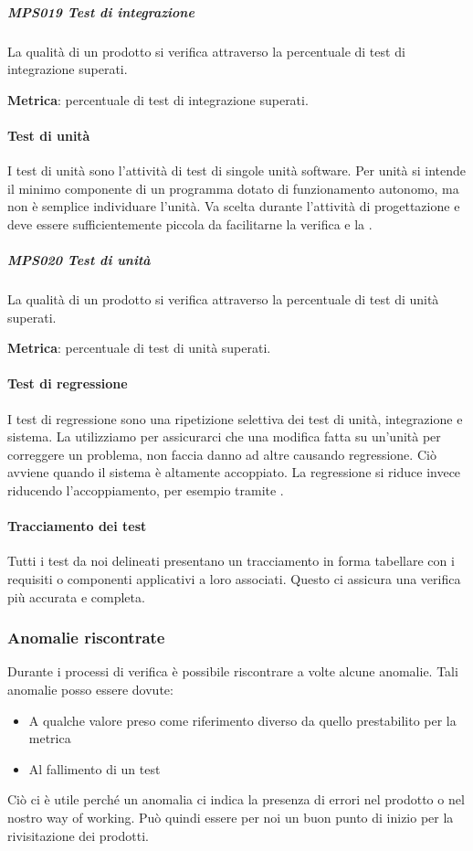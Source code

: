             \subparagraph{MPS019 Test di integrazione}\label{testintegrazione:met}
            La qualità di un prodotto si verifica attraverso la percentuale di test di integrazione superati.

            \textbf{Metrica}: percentuale di test di integrazione superati.

			\paragraph{Test di unità} \label{testunita}
			I test di unità sono l'attività di test di singole unità software.
			Per unità si intende il minimo componente di un programma dotato di funzionamento autonomo, ma non è semplice individuare l'unità.
			Va scelta durante l'attività di progettazione e deve essere sufficientemente piccola da facilitarne la verifica e la .

            \subparagraph{MPS020 Test di unità}\label{testunita:met}
            La qualità di un prodotto si verifica attraverso la percentuale di test di unità superati.

            \textbf{Metrica}: percentuale di test di unità superati.

			\paragraph{Test di regressione} \label{testregressione}
			I test di regressione sono una ripetizione selettiva dei test di unità, integrazione e sistema.
			La utilizziamo per assicurarci che una modifica fatta su un'unità per correggere un problema, non faccia danno ad altre causando regressione.
			Ciò avviene quando il sistema è altamente accoppiato.
			La regressione si riduce invece riducendo l'accoppiamento, per esempio tramite .

			\paragraph{Tracciamento dei test} \label{TracciamentoTest}
			Tutti i test da noi delineati presentano un tracciamento in forma tabellare con i requisiti o componenti applicativi a loro associati.
			Questo ci assicura una verifica più accurata e completa.


		\subsubsection{Anomalie riscontrate}\label{Anomalie}
		Durante i processi di verifica è possibile riscontrare a volte alcune anomalie.
		Tali anomalie posso essere dovute:
		\begin{itemize}
			\item A qualche valore preso come riferimento diverso da quello prestabilito per la metrica
			\item Al fallimento di un test
		\end{itemize}
		Ciò ci è utile perché un anomalia ci indica la presenza di errori nel prodotto o nel nostro way of working. Può quindi essere per noi un buon punto di inizio per la rivisitazione dei prodotti.
        
